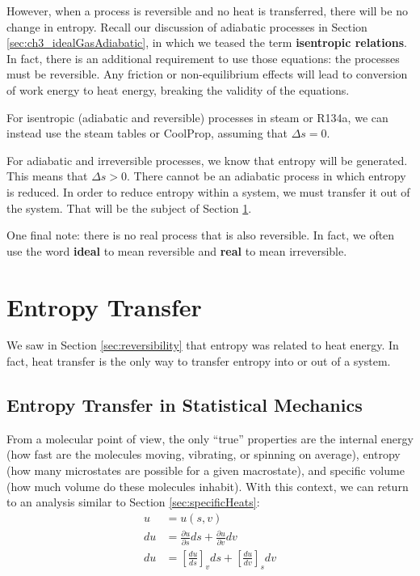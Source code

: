 However, when a process is reversible and no heat is transferred, there will be no change in entropy.  Recall our discussion of adiabatic processes in Section \ref{sec:ch3_idealGasAdiabatic}, in which we teased the term {\bf isentropic relations}.  In fact, there is an additional requirement to use those equations: the processes must be reversible.  Any friction or non-equilibrium effects will lead to conversion of work energy to heat energy, breaking the validity of the equations.

For isentropic (adiabatic and reversible) processes in steam or R134a, we can instead use the steam tables or CoolProp, assuming that $\Delta s = 0$.

For adiabatic and irreversible processes, we know that entropy will be generated.  This means that $\Delta s > 0$.  There cannot be an adiabatic process in which entropy is reduced.  In order to reduce entropy within a system, we must transfer it out of the system.  That will be the subject of Section \ref{sec:entropyTransfer}.

One final note: there is no real process that is also reversible.  In fact, we often use the word {\bf ideal} to mean reversible and {\bf real} to mean irreversible.  

\section{Entropy Transfer} \label{sec:entropyTransfer}
We saw in Section \ref{sec:reversibility} that entropy was related to heat energy.  In fact, heat transfer is the only way to transfer entropy into or out of a system.

\subsection{Entropy Transfer in Statistical Mechanics}
From a molecular point of view, the only ``true'' properties are the internal energy (how fast are the molecules moving, vibrating, or spinning on average), entropy (how many microstates are possible for a given macrostate), and specific volume (how much volume do these molecules inhabit).  With this context, we can return to an analysis similar to Section \ref{sec:specificHeats}:
\begin{align*}
  u &= u(s, v) \\
  du &= \frac{\partial u}{\partial s}ds + \frac{\partial u}{\partial v}dv \\
  du &= \left[\frac{d u}{d s}\right]_v ds + \left[\frac{d u}{d v}\right]_s dv
\end{align*}

